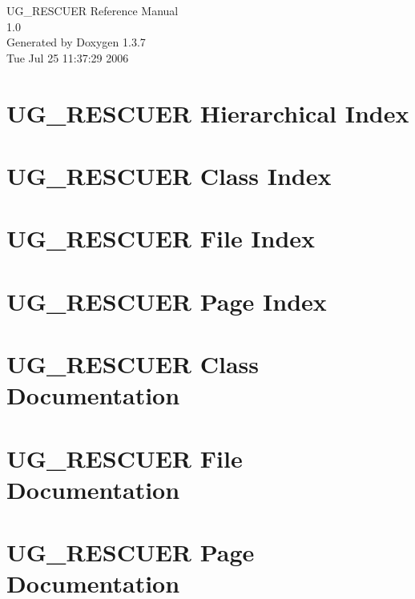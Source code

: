 \documentclass[a4paper]{book}
\begin{document}
\begin{titlepage}
\vspace*{7cm}
\begin{center}
{\Large UG\_\-RESCUER Reference Manual\\[1ex]\large 1.0 }\\
\vspace*{1cm}
{\large Generated by Doxygen 1.3.7}\\
\vspace*{0.5cm}
{\small Tue Jul 25 11:37:29 2006}\\
\end{center}
\end{titlepage}
\clearemptydoublepage
{}
\tableofcontents
\clearemptydoublepage
{}
\chapter{UG\_\-RESCUER Hierarchical Index}

\chapter{UG\_\-RESCUER Class Index}

\chapter{UG\_\-RESCUER File Index}

\chapter{UG\_\-RESCUER Page Index}

\chapter{UG\_\-RESCUER Class Documentation}



\chapter{UG\_\-RESCUER File Documentation}











\chapter{UG\_\-RESCUER Page Documentation}

\printindex
\end{document}
